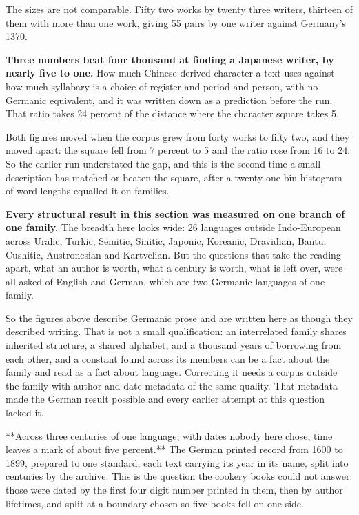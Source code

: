The sizes are not comparable. Fifty two works by twenty three writers, thirteen of them with more than one work, giving 55 pairs by one writer against Germany's 1370.

\textbf{Three numbers beat four thousand at finding a Japanese writer, by nearly five to one.} How much Chinese-derived character a text uses against how much syllabary is a choice of register and period and person, with no Germanic equivalent, and it was written down as a prediction before the run. That ratio takes 24 percent of the distance where the character square takes 5.

Both figures moved when the corpus grew from forty works to fifty two, and they moved apart: the square fell from 7 percent to 5 and the ratio rose from 16 to 24. So the earlier run understated the gap, and this is the second time a small description has matched or beaten the square, after a twenty one bin histogram of word lengths equalled it on families.

\textbf{Every structural result in this section was measured on one branch of one family.} The breadth here looks wide: 26 languages outside Indo-European across Uralic, Turkic, Semitic, Sinitic, Japonic, Koreanic, Dravidian, Bantu, Cushitic, Austronesian and Kartvelian. But the questions that take the reading apart, what an author is worth, what a century is worth, what is left over, were all asked of English and German, which are two Germanic languages of one family.

So the figures above describe Germanic prose and are written here as though they described writing. That is not a small qualification: an interrelated family shares inherited structure, a shared alphabet, and a thousand years of borrowing from each other, and a constant found across its members can be a fact about the family and read as a fact about language. Correcting it needs a corpus outside the family with author and date metadata of the same quality. That metadata made the German result possible and every earlier attempt at this question lacked it.

**Across three centuries of one language, with dates nobody here chose, time leaves a mark of about five percent.** The German printed record from 1600 to 1899, prepared to one standard, each text carrying its year in its name, split into centuries by the archive. This is the question the cookery books could not answer: those were dated by the first four digit number printed in them, then by author lifetimes, and split at a boundary chosen so five books fell on one side.

